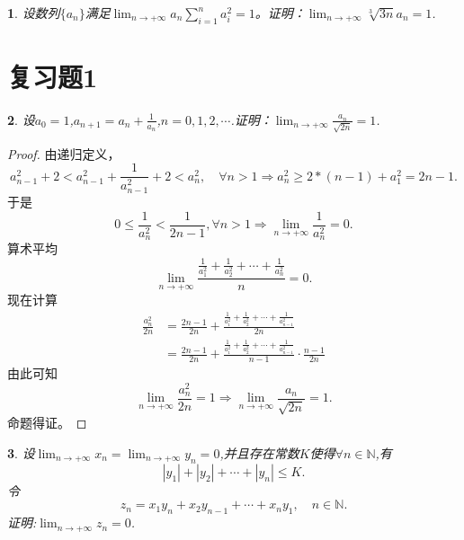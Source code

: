 \documentclass[utf8]{book}
\newtheorem{example}{}[section]             %
\begin{document}
\begin{example}
设数列$\{a_n\}$满足$\displaystyle\lim_{n\to +\infty}a_n \displaystyle\sum_{i=1}^na_i^2 = 1$。证明：$\displaystyle\lim_{n\to +\infty}\sqrt[3]{3n}a_n=1$.
\end{example}
\section{复习题1}
\begin{example}
设$a_0=1$,$a_{n+1}=a_n+\frac{1}{a_n}$,$n=0,1,2,\cdots$.证明：$\displaystyle\lim_{n\to +\infty}\frac{a_n}{\sqrt{2n}}= 1$.
\end{example}
\begin{proof}
由递归定义，
$$a_{n-1}^2+2 < a_{n-1}^2+\frac{1}{a^2_{n-1}} + 2< a_{n}^2,\quad\forall n > 1\Rightarrow a^2_{n}\geq 2*(n-1) + a_1^2=2n-1.$$
于是
$$0\leq \frac{1}{a_n^2} < \frac{1}{2n-1}, \forall n > 1\Rightarrow \displaystyle\lim_{n\to +\infty}\frac{1}{a_n^2}= 0.$$
算术平均
$$\displaystyle\lim_{n\to +\infty}\frac{\displaystyle\frac{1}{a_1^2}+\frac{1}{a_2^2} +\cdots +\frac{1}{a_n^2}}{n} = 0.$$
现在计算
\begin{equation*}
\begin{split}
\frac{a^2_n}{2n} &= \frac{2n-1}{2n} +\frac{\frac{1}{a_1^2}+\frac{1}{a_2^2} +\cdots +\frac{1}{a_{n-1}^2}}{2n}\\
&=\frac{2n-1}{2n} +\frac{\frac{1}{a_1^2}+\frac{1}{a_2^2} +\cdots +\frac{1}{a_{n-1}^2}}{n-1}\cdot\frac{n-1}{2n}
\end{split}
\end{equation*}
由此可知
$$\displaystyle\lim_{n\to +\infty}\frac{a^2_n}{2n}= 1\Rightarrow \displaystyle\lim_{n\to +\infty}\frac{a_n}{\sqrt{2n}}= 1.$$
命题得证。
\end{proof}
\begin{example}
设$\displaystyle\lim_{n\to +\infty}x_n=\lim_{n\to +\infty}y_n=0$,并且存在常数$K$使得$\forall n\in\mathbb{N}$,有$$|y_1|+|y_2|+\cdots+|y_n|\leq K.$$
令$$z_n=x_1y_n+x_2y_{n-1}+\cdots+x_ny_1,\quad n\in\mathbb{N}.$$证明:$\displaystyle\lim_{n\to +\infty}z_n=0$.
\end{example}
\end{document}

